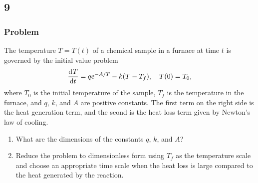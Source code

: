 \documentclass[12pt,twoside]{article}
\begin{document}
\subsection{9}
\subsubsection*{Problem}

The temperature $T=T(t)$ of a chemical sample in a furnace at time $t$ is
governed by the initial value problem
\begin{equation}
  \label{eq:9-problem}
  \frac{\mathrm{d}^{} {T}}{\mathrm{d}{t}^{}}=qe^{-A/T}-k(T-T_f),\quad T(0)=T_0,
\end{equation}
where $T_0$ is the initial temperature of the sample, $T_f$ is the temperature
in the furnace, and $q$, $k$, and $A$ are positive constants. The first term on
the right side is the heat generation term, and the seond is the heat loss term
given by Newton's law of cooling.
\begin{enumerate}
\item What are the dimensions of the constants $q$, $k$, and $A$?
\item Reduce the problem to dimensionless form using $T_f$ as the temperature
  scale and choose an appropriate time scale when the heat loss is large
  compared to the heat generated by the reaction.
\end{enumerate}
\end{document}
